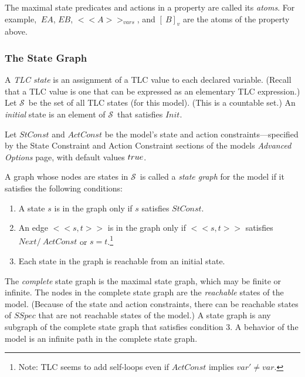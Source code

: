 \documentclass[fleqn,leqno]{article}
\newcommand{\states}{\ensuremath{\mathcal{S}}}
\begin{document}
The maximal state predicates and actions in a property are called its
\emph{atoms}.  For example, $~EA$, $EB$, $<<A>>_{vars}$, and $[~B]_{v}$
are the atoms of the property above.


\subsubsection{The State Graph}

A \emph{TLC state} is an assignment of a TLC value to each declared
variable.  (Recall that a TLC value is one that can be expressed as an
elementary TLC expression.)  Let \states\ be the set of all TLC states
(for this model).  (This is a countable set.)  An \emph{initial} state
is an element of \states\ that satisfies $Init$.


Let $StConst$ and $ActConst$ be the model's
state and action constraints---specified by the \textsf{State
Constraint} and \textsf{Action Constraint} sections of the models
\emph{Advanced Options} page, with default values $\TRUE$.  


A graph whose nodes are states in \states\ is called a \emph{state
graph} for the model if it satisfies the following conditions:
\begin{enumerate}
\item A state $s$ is in the graph only if $s$ satisfies $StConst$.

\item An edge $<<s, t>>$ is in the graph only if $<<s, t>>$ satisfies
$Next /\ ActConst$ or $s=t$.\footnote{Note: TLC seems to add self-loops
even if $ActConst$ implies $var'\neq var$.}

\item Each state in the graph is reachable from an initial state.

\end{enumerate}
The \emph{complete} state graph is the maximal state graph, which may
be finite or infinite.  The nodes in the complete state graph are the
\emph{reachable} states of the model.  (Because of the state and
action constraints, there can be reachable states of $SSpec$ that are
not reachable states of the model.)  A state graph is any subgraph of
the complete state graph that satisfies condition 3.  A behavior of
the model is an infinite path in the complete state graph.
\end{document}
